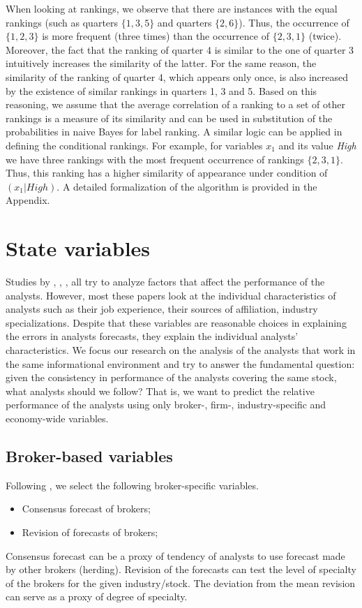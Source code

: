 \documentclass{article}\usepackage[]{graphicx}\usepackage[]{color}
\begin{document}
When looking at rankings, we observe that there are instances with the equal rankings (such as quarters $\{1,3,5\}$ and quarters $\{2,6\}$). Thus, the occurrence of $\{1,2,3\}$ is more frequent (three times) than the occurrence of $\{2,3,1\}$ (twice). Moreover, the fact that the ranking of quarter 4 is similar to the one of quarter 3 intuitively increases the similarity of the latter. For the same reason, the similarity of the ranking of quarter 4, which appears only once, is also increased by the existence of similar rankings in quarters 1, 3 and 5. Based on this reasoning, we assume that the average correlation of a ranking to a set of other rankings is a measure of its similarity and can be used in substitution of the probabilities in naive Bayes for label ranking. A similar logic can be applied in defining the conditional rankings. For example, for variables $x_1$ and its value \textit{High} we have three rankings with the most frequent occurrence of rankings $\{2,3,1\}$. Thus, this ranking has a higher similarity of appearance under condition of $(x_1|High)$. A detailed formalization of the algorithm is provided in the Appendix.



\section{State variables}

Studies by \cite{clement1999}, \cite{brown2003}, \cite{jegadeesh2004}, all try to analyze  factors that affect the performance of the analysts.  However, most these papers look at the individual characteristics of analysts such as their job experience, their sources of affiliation,  industry specializations. Despite that these variables are reasonable choices in explaining the errors in analysts forecasts, they explain the individual analysts' characteristics. We focus our research on the analysis of the analysts that work in the same informational environment and try to answer the fundamental question: given the consistency in  performance of the  analysts covering the same stock, what analysts should we follow? That is, we want to predict the relative performance of the analysts using only broker-,  firm-, industry-specific and economy-wide variables. 
 
\subsection{Broker-based variables}
Following \cite{clement1999,clement2003,brown2001}, we select the following broker-specific variables.
\begin{itemize}
\item Consensus forecast of brokers;
\item  Revision of forecasts of brokers;
\end{itemize}
Consensus forecast can be a proxy of tendency of analysts to use forecast made by other brokers (herding). Revision of the forecasts can test the level of specialty of the brokers for the given industry/stock. The deviation from the mean revision can serve as a proxy of degree of specialty. 
\end{document}
